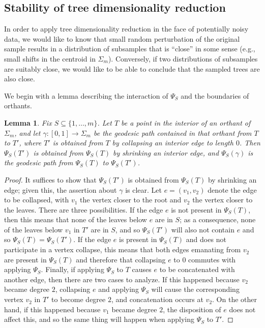 \documentclass[a4paper,11pt]{article}
\newtheorem{lemma}[theorem]{Lemma}
\begin{document}
\subsection{Stability of tree dimensionality reduction}

In order to apply tree dimensionality reduction in the face of potentially noisy data, we would like to know that small random perturbation of the original sample results in a distribution of subsamples that is ``close'' in some sense (e.g., small shifts in the centroid in $\Sigma_m$).
Conversely, if two distributions of subsamples are suitably close, we would like to be able to conclude that the sampled trees are also close.

We begin with a lemma describing the interaction of $\Psi_S$ and the boundaries of orthants.

\begin{lemma}\label{lem:rotprojcom}
Fix $S \subseteq \{1,\ldots,m\}$.
Let $T$ be a point in the interior of an orthant of $\Sigma_m$, and let $\gamma \colon [0,1] \to \Sigma_m$ be the geodesic path contained in that orthant from $T$ to $T'$, where $T'$ is obtained from $T$ by collapsing an interior edge to length $0$.
Then $\Psi_S(T')$ is obtained from $\Psi_S(T)$ by shrinking an interior edge, and $\Psi_S(\gamma)$ is the geodesic path from $\Psi_S(T)$ to $\Psi_S(T')$.
\end{lemma}

\begin{proof}
It suffices to show that $\Psi_{S}(T')$ is obtained from $\Psi_S(T)$ by shrinking an edge; given this, the assertion about $\gamma$ is clear.
Let $e = (v_1,v_2)$ denote the edge to be collapsed, with $v_1$ the vertex closer to the root and $v_2$ the vertex closer to the leaves.
There are three possibilities.
If the edge $e$ is not present in $\Psi_S(T)$, then this means that none of the leaves below $e$ are in $S$; as a consequence, none of the leaves below $v_1$ in $T'$ are in $S$, and so $\Psi_S(T')$ will also not contain $e$ and so $\Psi_S(T) = \Psi_S(T')$.
If the edge $e$ is present in $\Psi_S(T)$ and does not participate in a vertex collapse, this means that both edges emanating from $v_2$ are present in $\Psi_S(T)$ and therefore that collapsing $e$ to $0$ commutes with applying $\Psi_S$.
Finally, if applying $\Psi_S$ to $T$ causes $e$ to be concatenated with another edge, then there are two cases to analyze.
If this happened because $v_2$ became degree $2$, collapsing $e$ and applying $\Psi_S$ will cause the corresponding vertex $v_2$ in $T'$ to become degree $2$, and concatenation occurs at $v_2$.
On the other hand, if this happened because $v_1$ became degree $2$, the disposition of $e$ does not affect this, and so the same thing will happen when applying $\Psi_S$ to $T'$.
\end{proof}
\end{document}
